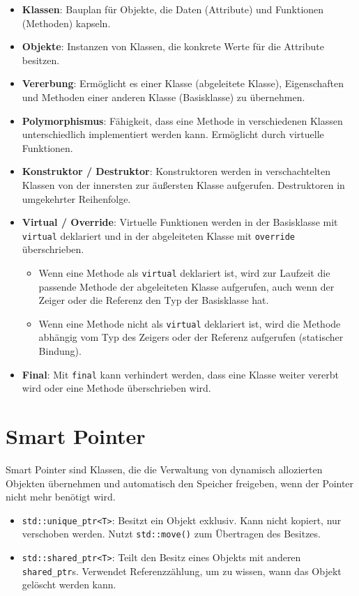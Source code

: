 \documentclass[8pt, landscape]{article}
\newcommand{\datastruct}[1]{\textbf{\textcolor{red!60!black}{#1}}}
\begin{document}
\begin{multicols*}{4}
\begin{itemize}
    \item \datastruct{Klassen}: Bauplan für Objekte, die Daten (Attribute) und Funktionen (Methoden) kapseln.
    \item \datastruct{Objekte}: Instanzen von Klassen, die konkrete Werte für die Attribute besitzen.
    \item \datastruct{Vererbung}: Ermöglicht es einer Klasse (abgeleitete Klasse), Eigenschaften und Methoden einer anderen Klasse (Basisklasse) zu übernehmen.
    \item \datastruct{Polymorphismus}: Fähigkeit, dass eine Methode in verschiedenen Klassen unterschiedlich implementiert werden kann. Ermöglicht durch virtuelle Funktionen.
   \item \datastruct{Konstruktor / Destruktor}: Konstruktoren werden in verschachtelten Klassen von der innersten zur äußersten Klasse aufgerufen. Destruktoren in umgekehrter Reihenfolge.
   \item \datastruct{Virtual / Override}: Virtuelle Funktionen werden in der Basisklasse mit \lstinline|virtual| deklariert und in der abgeleiteten Klasse mit \lstinline|override| überschrieben.
   \begin{itemize}
        \item Wenn eine Methode als \lstinline|virtual| deklariert ist, wird zur Laufzeit die passende Methode der abgeleiteten Klasse aufgerufen, auch wenn der Zeiger oder die Referenz den Typ der Basisklasse hat.
        \item Wenn eine Methode nicht als \lstinline|virtual| deklariert ist, wird die Methode abhängig vom Typ des Zeigers oder der Referenz aufgerufen (statischer Bindung).
   \end{itemize}
   \item \datastruct{Final}: Mit \lstinline|final| kann verhindert werden, dass eine Klasse weiter vererbt wird oder eine Methode überschrieben wird.
\end{itemize}

\section{Smart Pointer}

Smart Pointer sind Klassen, die die Verwaltung von dynamisch allozierten Objekten übernehmen und automatisch den Speicher freigeben, wenn der Pointer nicht mehr benötigt wird.

\begin{itemize}
    \item \lstinline|std::unique_ptr<T>|: Besitzt ein Objekt exklusiv. Kann nicht kopiert, nur verschoben werden. Nutzt \lstinline|std::move()| zum Übertragen des Besitzes.
    \item \lstinline|std::shared_ptr<T>|: Teilt den Besitz eines Objekts mit anderen \lstinline|shared_ptr|s. Verwendet Referenzzählung, um zu wissen, wann das Objekt gelöscht werden kann.
\end{itemize}


\end{multicols*}
\end{document}
